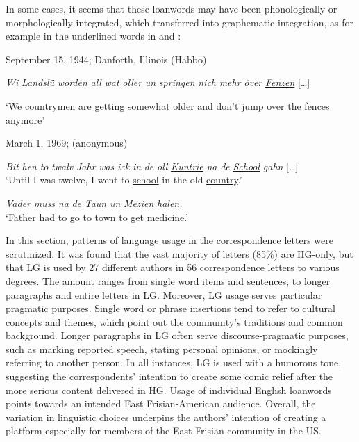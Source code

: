 \documentclass[output=paper]{langsci/langscibook}
\begin{document}
In some cases, it seems that these loanwords may have been phonologically or morphologically integrated, which transferred into graphematic integration, as for example in the underlined words in  and :

 
 \ea
\label{ex:rocker:15}
September 15, 1944; Danforth, Illinois (Habbo)\smallskip\\\relax 
 
\textit{Wi} \textit{Landslü} \textit{worden} \textit{all} \textit{wat} \textit{oller} \textit{un} \textit{springen} \textit{nich} \textit{mehr} \textit{över} \underline{\textit{Fenzen}} […]\smallskip\\\relax 

‘We countrymen are getting somewhat older and don’t jump over the \underline{fences} anymore’
\z

 
 \ea
\label{ex:rocker:16}
March 1, 1969; (anonymous)\smallskip\\\relax 

	\ea \textit{Bit} \textit{hen} \textit{to} \textit{twalv} \textit{Jahr} \textit{was} \textit{ick} \textit{in} \textit{de} \textit{oll} \underline{\textit{Kuntrie}} \textit{na} \textit{de} \underline{\textit{School}} \textit{gahn} […]\\
 
	{‘}Until I was twelve, I went to \underline{school} in the old \underline{country}.’\smallskip\\\relax 
 
	\ex \textit{Vader} \textit{muss} \textit{na} \textit{de} \underline{\textit{Taun}} \textit{un} \textit{Mezien} \textit{halen.}\\
 
 ‘Father had to go to \underline{town} to get medicine.’
 \z
 \z

 
In this section, patterns of language usage in the correspondence letters were scrutinized. It was found that the vast majority of letters (85\%) are HG-only, but that LG is used by 27 different authors in 56 correspondence letters to various degrees. The amount ranges from single word items and sentences, to longer paragraphs and entire letters in LG. Moreover, LG usage serves particular pragmatic purposes. Single word or phrase insertions tend to refer to cultural concepts and themes, which point out the community’s traditions and common background. Longer paragraphs in LG often serve discourse-pragmatic purposes, such as marking reported speech, stating personal opinions, or mockingly referring to another person. In all instances, LG is used with a humorous tone, suggesting the correspondents’ intention to create some comic relief after the more serious content delivered in HG. Usage of individual English loanwords points towards an intended East Frisian-American audience. Overall, the variation in linguistic choices underpins the authors’ intention of creating a platform especially for members of the East Frisian community in the US. 
 
\end{document}
